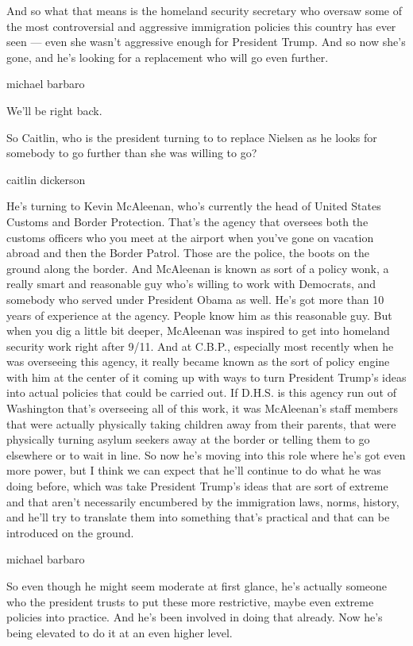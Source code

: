 And so what that means is the homeland security secretary who oversaw
some of the most controversial and aggressive immigration policies this
country has ever seen --- even she wasn't aggressive enough for
President Trump. And so now she's gone, and he's looking for a
replacement who will go even further.

michael barbaro

We'll be right back.

So Caitlin, who is the president turning to to replace Nielsen as he
looks for somebody to go further than she was willing to go?

caitlin dickerson

He's turning to Kevin McAleenan, who's currently the head of United
States Customs and Border Protection. That's the agency that oversees
both the customs officers who you meet at the airport when you've gone
on vacation abroad and then the Border Patrol. Those are the police, the
boots on the ground along the border. And McAleenan is known as sort of
a policy wonk, a really smart and reasonable guy who's willing to work
with Democrats, and somebody who served under President Obama as well.
He's got more than 10 years of experience at the agency. People know him
as this reasonable guy. But when you dig a little bit deeper, McAleenan
was inspired to get into homeland security work right after 9/11. And at
C.B.P., especially most recently when he was overseeing this agency, it
really became known as the sort of policy engine with him at the center
of it coming up with ways to turn President Trump's ideas into actual
policies that could be carried out. If D.H.S. is this agency run out of
Washington that's overseeing all of this work, it was McAleenan's staff
members that were actually physically taking children away from their
parents, that were physically turning asylum seekers away at the border
or telling them to go elsewhere or to wait in line. So now he's moving
into this role where he's got even more power, but I think we can expect
that he'll continue to do what he was doing before, which was take
President Trump's ideas that are sort of extreme and that aren't
necessarily encumbered by the immigration laws, norms, history, and
he'll try to translate them into something that's practical and that can
be introduced on the ground.

michael barbaro

So even though he might seem moderate at first glance, he's actually
someone who the president trusts to put these more restrictive, maybe
even extreme policies into practice. And he's been involved in doing
that already. Now he's being elevated to do it at an even higher level.


